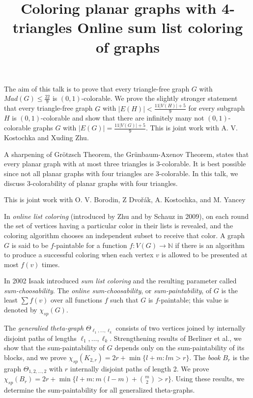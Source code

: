 \documentclass{article}
\begin{document}
The aim of this talk is to prove that every triangle-free graph $G$ with $Mad(G)\leq \frac{22}{9}$ is $(0,1)$-colorable. We prove the slightly
stronger statement that every triangle-free graph $G$ with $|E(H)|<\frac{11|V(H)|+5}{9}$ for every subgraph $H$ is $(0,1)$-colorable and show that there are infinitely many not  $(0,1)$-colorable graphs $G$ with $|E(G)|=\frac{11|V(G)|+5}{9}$. This is joint work with A. V. Kostochka and Xuding Zhu.


\vspace{.25in}

\title{ Coloring planar graphs with 4-triangles}
\endtitle
A sharpening of Gr\" otzsch Theorem, the Gr\" unbaum-Axenov
Theorem, states that
every planar graph with at most three triangles is 3-colorable.
It is best possible since not all planar graphs with four triangles
are 3-colorable.
In this talk, we discuss 3-colorability of planar graphs
with four triangles.

This is joint work with O. V. Borodin, Z Dvo\v{r}\'ak, A. Kostochka, and M. Yancey



\vspace{.25in}

\title{ Online sum list coloring of graphs}
\endtitle
In \textit{online list coloring} (introduced by Zhu and by Schauz in 2009), on each round the set of vertices having a particular color in their lists is revealed, and the coloring algorithm chooses an independent subset to receive that color. A graph $G$ is said to be $f$-paintable for a function $f: V(G) \to \mathbb{N}$ if there is an algorithm to produce a successful coloring when each vertex $v$ is allowed to be presented at most $f(v)$ times.

In 2002 Isaak introduced \textit{sum list coloring} and the resulting parameter called \textit{sum-choosability}. The \textit{online sum-choosability}, or \textit{sum-paintability}, of $G$  is the least $\sum f(v)$ over all functions $f$ such that $G$ is $f$-paintable; this value is denoted by $\chi_{sp}(G)$.

The \textit{generalied theta-graph} $\Theta_{\ell_1,\dots,\ell_k}$ consists of two vertices joined by internally disjoint paths of lengths $\ell_1,\dots,\ell_k$.
Strengthening results of Berliner et al., we show that the sum-paintability of $G$ depends only on the sum-paintability of its blocks, and we prove $\chi_{sp}(K_{2,r})=2r+\min\{ l + m : lm>r \}$.
The \textit{book} $B_r$ is the graph $\Theta_{1,2,\dots,2}$ with $r$ internally disjoint paths of length 2. We prove $\chi_{sp}(B_r)=2r+\min\{ l + m : m(l-m)+\binom{m}{2} > r \}$.
Using these results, we determine the sum-paintability for all generalized theta-graphs.
\end{document}
